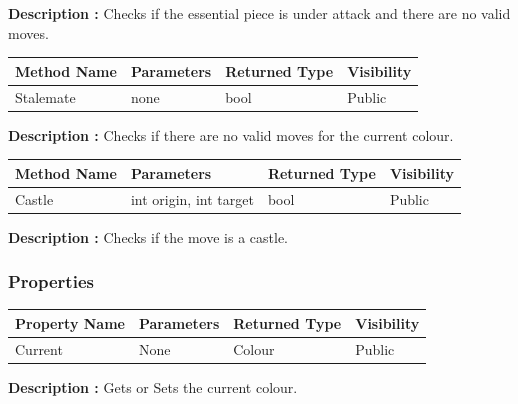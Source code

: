 \documentclass[12pt]{article}
\begin{document}
\textbf{Description :} Checks if the essential piece is under attack and there are no valid moves.    

\begin{table}[H]
    \begin{tabular}{|l|l|l|l|}
    \hline
    \rowcolor[HTML]{EFEFEF} 
    \cellcolor[HTML]{EFEFEF}\textbf{Method Name} & \textbf{Parameters}     & \textbf{Returned Type} & \textbf{Visibility} \\ \hline
    Stalemate                                    & none                    & bool                   & Public              \\ \hline
    \end{tabular}
\end{table}

\textbf{Description :} Checks if there are no valid moves for the current colour.    

\begin{table}[H]
    \begin{tabular}{|l|l|l|l|}
    \hline
    \rowcolor[HTML]{EFEFEF} 
    \cellcolor[HTML]{EFEFEF}\textbf{Method Name} & \textbf{Parameters}      & \textbf{Returned Type} & \textbf{Visibility} \\ \hline
    Castle                                       & int origin, int target   & bool                   & Public              \\ \hline
    \end{tabular}
\end{table}

\textbf{Description :} Checks if the move is a castle.   


\subsubsection{Properties}

\begin{table}[H]
    \begin{tabular}{|l|l|l|l|}
    \hline
    \rowcolor[HTML]{EFEFEF} 
    \cellcolor[HTML]{EFEFEF}\textbf{Property Name} & \textbf{Parameters}  & \textbf{Returned Type} & \textbf{Visibility} \\ \hline
    Current                                        & None                 & Colour                 & Public              \\ \hline
    \end{tabular}
\end{table}

\textbf{Description :} Gets or Sets the current colour. 
\end{document}
